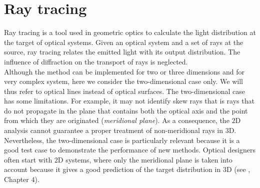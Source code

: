 \chapter{Ray tracing}\label{chap:raytracing}
Ray tracing is a tool used in geometric optics to calculate the light distribution at the target of optical systems.
Given an optical system and a set of rays at the source, ray tracing relates the emitted light with its output distribution. 
The influence of diffraction on the transport of rays is neglected. \\ \indent
Although the method can be implemented for two or three dimensions and for very complex system, here we consider the two-dimensional case only. 
We will thus refer to optical lines instead of optical surfaces.
The two-dimensional case has some limitations. For example, it may not identify skew rays that is rays that do not propagate in the plane that contains both the optical axis and the point from which they are originated (\textit{meridional plane}). As a consequence, the $2$D analysis cannot guarantee a proper treatment of non-meridional rays in $3$D. 
Nevertheless, the two-dimensional case is particularly relevant because it is a good test case to demonstrate the performance of new methods.
Optical designers often start with $2$D systems, where only the meridional plane is taken into account because it gives a good prediction of the target distribution in $3$D
(see \cite{winston2005nonimaging}, Chapter $4$).
